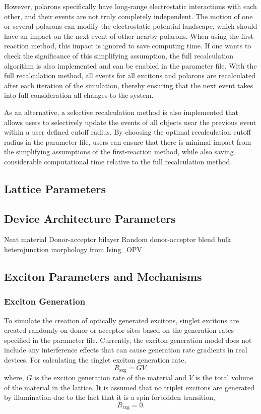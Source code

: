 \documentclass[%
 reprint,onecolumn,notitlepage,
superscriptaddress,longbibliography,
 amsmath,amssymb,
 aps,rmp,floatfix,
]{revtex4-1}
\begin{document}
However, polarons specifically have long-range electrostatic interactions with each other, and their events are not truly completely independent.
The motion of one or several polarons can modify the electrostatic potential landscape, which should have an impact on the next event of other nearby polarons. 
When using the first-reaction method, this impact is ignored to save computing time. 
If one wants to check the significance of this simplifying assumption, the full recalculation algorithm is also implemented and can be enabled in the parameter file. 
With the full recalculation method, all events for all excitons and polarons are recalculated after each iteration of the simulation, thereby ensuring that the next event takes into full consideration all changes to the system.

As an alternative, a selective recalculation method is also implemented that allows users to selectively update the events of all objects near the previous event within a user defined cutoff radius.\cite{heiber2012jcp} 
By choosing the optimal recalculation cutoff radius in the parameter file, users can ensure that there is minimal impact from the simplifying assumptions of the first-reaction method, while also saving considerable computational time relative to the full recalculation method.

\subsection{Lattice Parameters}

\subsection{Device Architecture Parameters}

Neat material
Donor-acceptor bilayer
Random donor-acceptor blend
bulk heterojunction morphology from Ising\_OPV

\subsection{Exciton Parameters and Mechanisms}

\subsubsection{Exciton Generation}

To simulate the creation of optically generated excitons, singlet excitons are created randomly on donor or acceptor sites based on the generation rates specified in the parameter file. 
Currently, the exciton generation model does not include any interference effects that can cause generation rate gradients in real devices. 
For calculating the singlet exciton generation rate,
$$R_\text{sxg} = G V.$$
where, $G$ is the exciton generation rate of the material and $V$ is the total volume of the material in the lattice.
It is assumed that no triplet excitons are generated by illumination due to the fact that it is a spin forbidden transition,
$$R_\text{txg} = 0.$$
\end{document}
